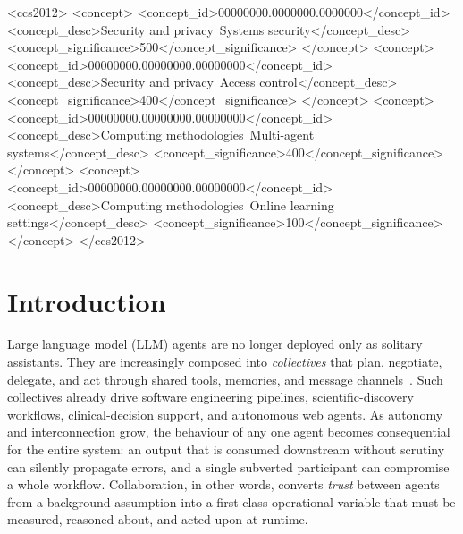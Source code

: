 \documentclass[sigconf,anonymous]{acmart}
\theoremstyle{plain}
\theoremstyle{definition}
\theoremstyle{remark}
\begin{document}
\begin{CCSXML}
<ccs2012>
 <concept>
  <concept_id>00000000.0000000.0000000</concept_id>
  <concept_desc>Security and privacy~Systems security</concept_desc>
  <concept_significance>500</concept_significance>
 </concept>
 <concept>
  <concept_id>00000000.00000000.00000000</concept_id>
  <concept_desc>Security and privacy~Access control</concept_desc>
  <concept_significance>400</concept_significance>
 </concept>
 <concept>
  <concept_id>00000000.00000000.00000000</concept_id>
  <concept_desc>Computing methodologies~Multi-agent systems</concept_desc>
  <concept_significance>400</concept_significance>
 </concept>
 <concept>
  <concept_id>00000000.00000000.00000000</concept_id>
  <concept_desc>Computing methodologies~Online learning settings</concept_desc>
  <concept_significance>100</concept_significance>
 </concept>
</ccs2012>
\end{CCSXML}



\maketitle

\section{Introduction}
\label{sec:intro}
Large language model (LLM) agents are no longer deployed only as solitary assistants.
They are increasingly composed into \emph{collectives} that plan, negotiate, delegate,
and act through shared tools, memories, and message
channels~\cite{wang2024survey,guo2024llmmultiagent,tran2025multiagent,hong2308metagpt}.
Such collectives already drive software engineering pipelines, scientific-discovery
workflows, clinical-decision support, and autonomous web agents. As autonomy and
interconnection grow, the behaviour of any one agent becomes consequential for the
entire system: an output that is consumed downstream without scrutiny can silently
propagate errors, and a single subverted participant can compromise a whole workflow.
Collaboration, in other words, converts \emph{trust} between agents from a background
assumption into a first-class operational variable that must be measured, reasoned about,
and acted upon at runtime.
\end{document}
